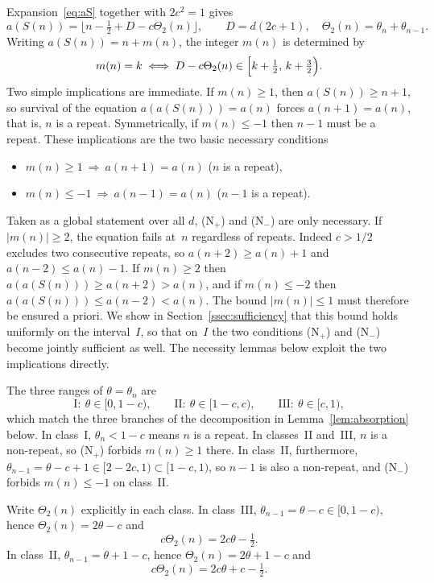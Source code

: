 \documentclass{birkjour}
\theoremstyle{definition}
\theoremstyle{remark}
\newcommand{\fl}[1]{\lfloor #1 \rfloor}
\begin{document}
Expansion~\eqref{eq:aS} together with $2c^{2}=1$ gives
\begin{equation*}  a(S(n))=\fl{n-\tfrac{1}{2}+D-c\Theta_{2}(n)},
  \qquad D=d(2c+1),\quad \Theta_{2}(n)=\theta_{n}+\theta_{n-1}.
\end{equation*}
Writing $a(S(n))=n+m(n)$, the integer $m(n)$ is
determined by
\[
  m(n)=k \iff D-c\Theta_{2}(n)\in\Bigl[k+\tfrac{1}{2},\,k+\tfrac{3}{2}\Bigr).
\]
Two simple implications are immediate. If $m(n)\ge 1$,
then $a(S(n))\ge n+1$, so survival of the equation
$a(a(S(n)))=a(n)$ forces $a(n+1)=a(n)$, that is,
$n$ is a repeat. Symmetrically, if $m(n)\le -1$
then $n-1$ must be a repeat. These implications are
the two basic necessary conditions
\begin{itemize}
\item[(N$_{+}$)] $m(n)\ge 1\ \Rightarrow\ a(n+1)=a(n)$
($n$ is a repeat),
\item[(N$_{-}$)] $m(n)\le -1\ \Rightarrow\ a(n-1)=a(n)$
($n-1$ is a repeat).
\end{itemize}
Taken as a global statement over all $d$, (N$_{+}$) and
(N$_{-}$) are only necessary. If $|m(n)|\ge 2$, the equation
fails at~$n$ regardless of repeats. Indeed $c>1/2$ excludes
two consecutive repeats, so $a(n{+}2)\ge a(n)+1$ and
$a(n{-}2)\le a(n)-1$. If $m(n)\ge 2$ then
$a(a(S(n)))\ge a(n{+}2)>a(n)$, and if $m(n)\le -2$ then
$a(a(S(n)))\le a(n{-}2)<a(n)$. The bound $|m(n)|\le 1$ must
therefore be ensured a priori.
We show in Section~\ref{ssec:sufficiency} that this
bound holds uniformly on the interval~$I$, so that
on~$I$ the two conditions (N$_{+}$) and (N$_{-}$)
become jointly sufficient as well. The necessity
lemmas below exploit the two implications directly.

The three ranges of $\theta=\theta_{n}$ are
\[
  \mathrm{I}:\ \theta\in[0,1{-}c),\qquad
  \mathrm{II}:\ \theta\in[1{-}c,c),\qquad
  \mathrm{III}:\ \theta\in[c,1),
\]
which match the three branches of the decomposition
in Lemma~\ref{lem:absorption} below. In class~I,
$\theta_{n}<1-c$ means $n$ is a repeat. In classes~II
and~III, $n$ is a non-repeat, so (N$_{+}$) forbids
$m(n)\ge 1$ there. In class~II, furthermore,
$\theta_{n-1}=\theta-c+1\in[2-2c,1)\subset[1-c,1)$,
so $n-1$ is also a non-repeat, and (N$_{-}$) forbids
$m(n)\le -1$ on class~II.

Write $\Theta_{2}(n)$ explicitly in each class.
In class~III, $\theta_{n-1}=\theta-c\in[0,1-c)$,
hence $\Theta_{2}(n)=2\theta-c$ and
\begin{equation}\label{eq:cTheta_III}
  c\Theta_{2}(n)=2c\theta-\tfrac{1}{2}.
\end{equation}
In class~II, $\theta_{n-1}=\theta+1-c$, hence
$\Theta_{2}(n)=2\theta+1-c$ and
\begin{equation}\label{eq:cTheta_II}
  c\Theta_{2}(n)=2c\theta+c-\tfrac{1}{2}.
\end{equation}
\end{document}
